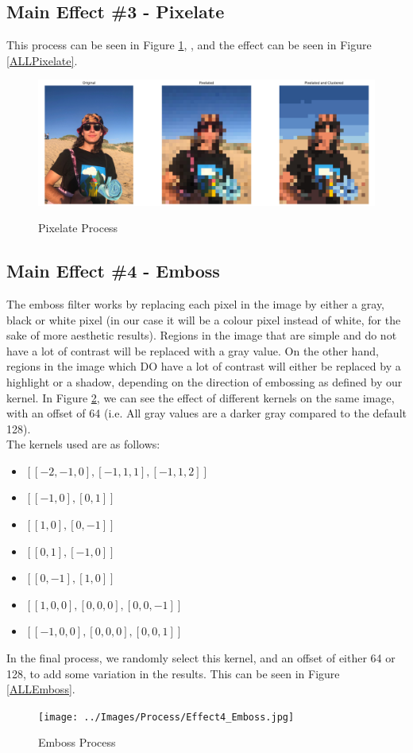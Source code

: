 \documentclass[a4paper,10pt]{report}
\begin{document}
	
	
	\subsection{Main Effect \#3 - Pixelate}
	This process can be seen in Figure \ref{Process_Pixelate}, , and the effect can be seen in Figure \ref{ALLPixelate}.
	\begin{figure}[h]
		\caption{Pixelate Process}
		\centering
		\includegraphics[width=\linewidth]{../Images/Process/Effect3_Pixelate.jpg}
		\label{Process_Pixelate}
	\end{figure}
	
	
	
	
	\subsection{Main Effect \#4 - Emboss}
	The emboss filter works by replacing each pixel in the image by either a gray, black or white pixel (in our case it will be a colour pixel instead of white, for the sake of more aesthetic results). Regions in the image that are simple and do not have a lot of contrast will be replaced with a gray value. On the other hand, regions in the image which DO have a lot of contrast will either be replaced by a highlight or a shadow, depending on the direction of embossing as defined by our kernel. In Figure \ref{Process_Emboss}, we can see the effect of different kernels on the same image, with an offset of 64 (i.e. All gray values are a darker gray compared to the default 128). \\
	The kernels used are as follows: 
	\begin{itemize}
		\item $[[-2,-1,0],[-1,1,1],[-1,1,2]]$
		\item $[[-1, 0], [0, 1]]$
		\item $[[1,0],[0,-1]]$
		\item $[[0,1],[-1,0]]$
		\item $[[0,-1],[1,0]]$
		\item $[[1,0,0],[0,0,0],[0,0,-1]]$
		\item $[[-1,0,0],[0,0,0],[0,0,1]]$
	\end{itemize}
	In the final process, we randomly select this kernel, and an offset of either 64 or 128, to add some variation in the results. This can be seen in Figure \ref{ALLEmboss}.
	\begin{figure}[h]
		\caption{Emboss Process}
		\centering
		\texttt{[image: ../Images/Process/Effect4\_Emboss.jpg]}
		\label{Process_Emboss}
	\end{figure}
	
\end{document}
